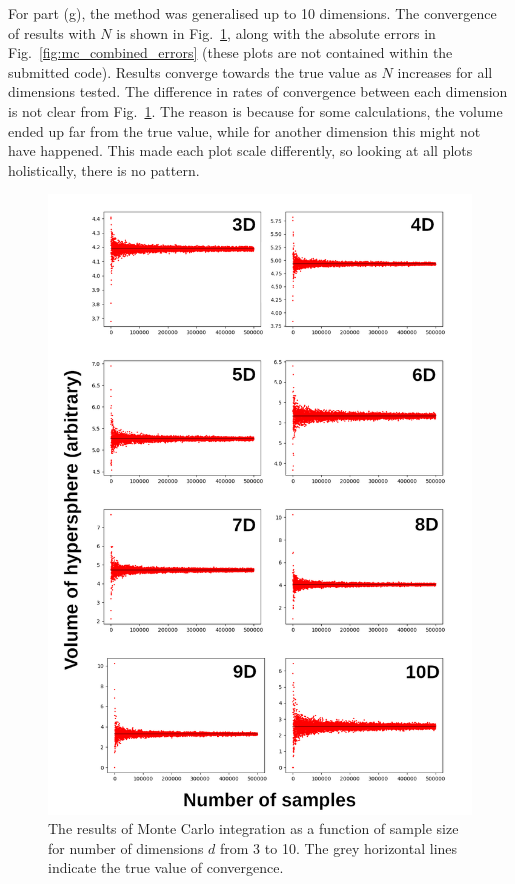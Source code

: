 \documentclass[hyphens,twocolumn,nobalancelastpage,aps,10pt,citeautoscript,longbibliography]{revtex4-2}
\begin{document}
For part (g), the method was generalised up to 10 dimensions. The convergence
of results with $N$ is shown in Fig.~\ref{fig:mc_combined_results}, along with
the absolute errors in Fig.~\ref{fig:mc_combined_errors} (these plots are not
contained within the submitted code). Results converge towards the true value
as $N$ increases for all dimensions tested. The difference in rates of
convergence between each dimension is not clear from
Fig.~\ref{fig:mc_combined_results}. The reason is because for some
calculations, the volume ended up far from the true value, while for another
dimension this might not have happened. This made each plot scale differently,
so looking at all plots holistically, there is no pattern.

\begin{figure}[htpb] \centering
	\includegraphics[width=1\linewidth]{./assets/monte_carlo/combined_results.png}
	\caption{The results of Monte Carlo integration as a function of sample size for number of dimensions $d$ from 3 to 10. The grey horizontal lines indicate the true value of convergence.}%
	\label{fig:mc_combined_results}
\end{figure}
\end{document}
